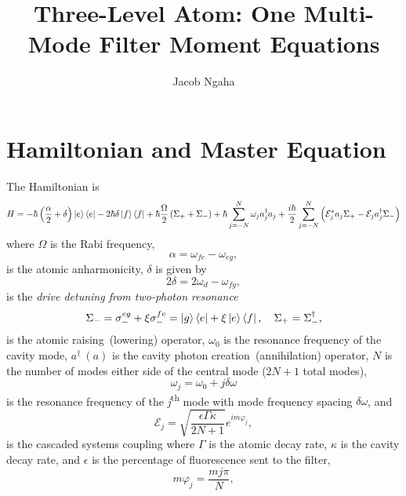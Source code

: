 \documentclass{article}
\title{Three-Level Atom: One Multi-Mode Filter Moment Equations}
\author{Jacob Ngaha}
\begin{document}
\maketitle

\section{Hamiltonian and Master Equation}

The Hamiltonian is
\begin{equation}\label{hamiltonian}
	H = -\hbar \left( \frac{\alpha}{2} + \delta \right) \ket{e}\bra{e} - 2 \hbar \delta \ket{f}\bra{f} + \hbar \frac{\Omega}{2} \left( \Sigma_{+} + \Sigma_{-} \right) + \hbar \sum_{j=-N}^{N} \omega_{j} a^{\dagger}_{j} a_{j} + \frac{i \hbar}{2} \sum_{j=-N}^{N} \left( \mathcal{E}_{j}^{*} a_{j} \Sigma_{+} - \mathcal{E}_{j} a^{\dagger}_{j} \Sigma_{-} \right)
\end{equation}
where $\Omega$ is the Rabi frequency,
\begin{equation}
	\alpha = \omega_{fe} - \omega_{eg},
\end{equation}
is the atomic anharmonicity, $\delta$ is given by
\begin{equation}
	2\delta = 2\omega_{d} - \omega_{fg},
\end{equation}
is the \textit{drive detuning from two-photon resonance}
\begin{equation}
	\Sigma_{-} = \sigma_{-}^{eg} + \xi \sigma_{-}^{fe} = \ket{g}\bra{e} + \xi \ket{e}\bra{f}, \quad \Sigma_{+} = \Sigma_{-}^{\dagger},
\end{equation}
is the atomic raising~(lowering) operator, $\omega_{0}$ is the resonance frequency of the cavity mode, $a^{\dagger}~(a)$ is the cavity photon creation~(annihilation) operator, $N$ is the number of modes either side of the central mode ($2N+1$ total modes),
\begin{equation}
	\omega_{j} = \omega_{0} + j \delta\omega
\end{equation}
is the resonance frequency of the \textit{j}\textsuperscript{th} mode with mode frequency spacing $\delta\omega$, and
\begin{equation}
	\mathcal{E}_{j} = \sqrt{\frac{\epsilon \Gamma \kappa}{2N + 1}} e^{i m \varphi_{j}},
\end{equation}
is the cascaded systems coupling where $\Gamma$ is the atomic decay rate, $\kappa$ is the cavity decay rate, and $\epsilon$ is the percentage of fluorescence sent to the filter,
\begin{equation}
	m \varphi_{j} = \frac{m j \pi}{N},
\end{equation}
\end{document}
